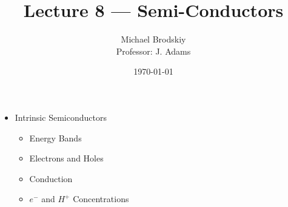 


\title{Lecture 8 — Semi-Conductors}
\date{\today}
\author{Michael Brodskiy\\ \small Professor: J. Adams}



\maketitle

\begin{itemize}

  \item Intrinsic Semiconductors

    \begin{itemize}

      \item Energy Bands

      \item Electrons and Holes

      \item Conduction

      \item $e^-$ and $H^+$ Concentrations

    \end{itemize}

\end{itemize}



